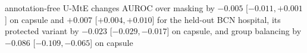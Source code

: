 annotation-free U-MtE changes AUROC over masking by $-0.005$ [$-0.011, +0.001$] on capsule and $+0.007$ [$+0.004, +0.010$] for the held-out BCN hospital, its protected variant by $-0.023$ [$-0.029, -0.017$] on capsule, and group balancing by $-0.086$ [$-0.109, -0.065$] on capsule%
